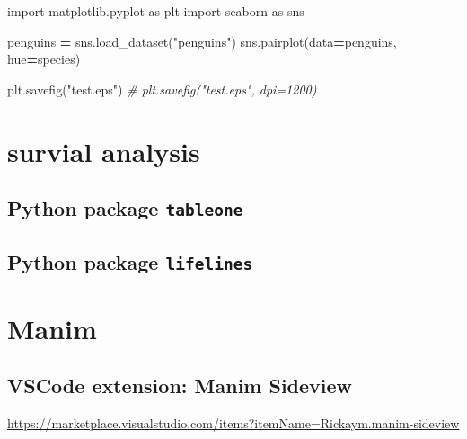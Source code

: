 \documentclass[
]{book}
\newenvironment{Shaded}{\begin{snugshade}}{\end{snugshade}}
\newcommand{\CommentTok}[1]{\textcolor[rgb]{0.56,0.35,0.01}{\textit{#1}}}
\newcommand{\ImportTok}[1]{#1}
\newcommand{\NormalTok}[1]{#1}
\newcommand{\OperatorTok}[1]{\textcolor[rgb]{0.81,0.36,0.00}{\textbf{#1}}}
\newcommand{\StringTok}[1]{\textcolor[rgb]{0.31,0.60,0.02}{#1}}
\theoremstyle{definition}
\theoremstyle{definition}
\theoremstyle{definition}
\theoremstyle{definition}
\theoremstyle{remark}
\begin{document}
\begin{Shaded}
\begin{Highlighting}[]
\ImportTok{import}\NormalTok{ matplotlib.pyplot }\ImportTok{as}\NormalTok{ plt}
\ImportTok{import}\NormalTok{ seaborn }\ImportTok{as}\NormalTok{ sns}

\NormalTok{penguins }\OperatorTok{=}\NormalTok{ sns.load\_dataset(}\StringTok{"penguins"}\NormalTok{)}
\NormalTok{sns.pairplot(data}\OperatorTok{=}\NormalTok{penguins,}
\NormalTok{             hue}\OperatorTok{=}\StringTok{\textquotesingle{}species\textquotesingle{}}\NormalTok{)}

\NormalTok{plt.savefig(}\StringTok{"test.eps"}\NormalTok{)}
\CommentTok{\# plt.savefig("test.eps", dpi=1200)}
\end{Highlighting}
\end{Shaded}

\hypertarget{survial-analysis}{%
\chapter{survial analysis}\label{survial-analysis}}

\hypertarget{python-package-tableone}{%
\section{\texorpdfstring{Python package \texttt{tableone}}{Python package tableone}}\label{python-package-tableone}}

\hypertarget{python-package-lifelines}{%
\section{\texorpdfstring{Python package \texttt{lifelines}}{Python package lifelines}}\label{python-package-lifelines}}

\hypertarget{manim}{%
\chapter{Manim}\label{manim}}

\hypertarget{vscode-extension-manim-sideview}{%
\section{VSCode extension: Manim Sideview}\label{vscode-extension-manim-sideview}}

\url{https://marketplace.visualstudio.com/items?itemName=Rickaym.manim-sideview}
\end{document}
